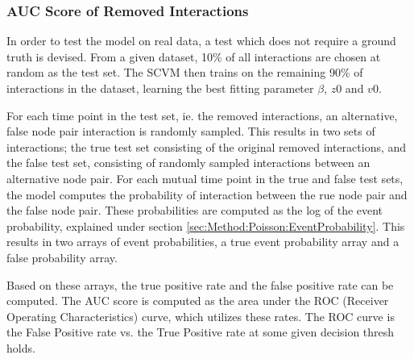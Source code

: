 \subsubsection{AUC Score of Removed Interactions}
\label{sec:Method:Evaluation:AUC}
In order to test the model on real data, a test which does not require a ground truth is devised.
From a given dataset, 10\% of all interactions are chosen at random as the test set.
The SCVM then trains on the remaining 90\% of interactions in the dataset, learning the best fitting parameter $\beta$, $z0$ and $v0$.

For each time point in the test set, ie. the removed interactions, an alternative, false node pair interaction is randomly sampled.
This results in two sets of interactions; the true test set consisting of the original removed interactions, and the false test set, consisting of randomly sampled interactions between an alternative node pair.
For each mutual time point in the true and false test sets, the model computes the probability of interaction between the rue node pair and the false node pair.
These probabilities are computed as the log of the event probability, explained under section \ref{sec:Method:Poisson:EventProbability}.
This results in two arrays of event probabilities, a true event probability array and a false probability array.

Based on these arrays, the true positive rate and the false positive rate can be computed.
The AUC score is computed as the area under the ROC (Receiver Operating Characteristics) curve, which utilizes these rates.
The ROC curve is the False Positive rate vs. the True Positive rate at some given decision thresh holds.




